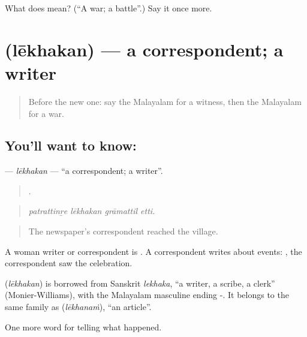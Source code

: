 \begin{tcolorbox}[breakable,colback=teal!4,colframe=teal!35!black,title={Before you move on}]
What does  mean? (\textquotedblleft{}A war; a battle\textquotedblright{}.) Say it once more.
\end{tcolorbox}
\section[\texorpdfstring{\ml{ലേഖകൻ} (lēkhakan)}{ലേഖകൻ (lēkhakan)}]{ (lēkhakan) — a correspondent; a writer}

\label{lesson:ML-C349-lekhakan}



\begin{quote}
Before the new one: say the Malayalam for a witness, then the Malayalam for a war.
\end{quote}

\subsection*{You'll want to know: }
\textbf{} — \emph{lēkhakan} — \textquotedblleft{}a correspondent; a writer\textquotedblright{}.

\begin{quote}
   .
\end{quote}

\begin{quote}
\emph{patrattinṟe lēkhakan grāmattil etti.}
\end{quote}

\begin{quote}
The newspaper's correspondent reached the village.
\end{quote}

A woman writer or correspondent is . A correspondent writes about events:   , the correspondent saw the celebration.

\begin{cousinweb}
\textbf{} (\emph{lēkhakan}) is borrowed from Sanskrit \emph{lekhaka}, \textquotedblleft{}a writer, a scribe, a clerk\textquotedblright{} (Monier-Williams), with the Malayalam masculine ending -. It belongs to the same family as  (\emph{lēkhanaṁ}), \textquotedblleft{}an article\textquotedblright{}.
\end{cousinweb}

\begin{grammarlens}[title={What you've built}]
One more word for telling what happened.
\end{grammarlens}

